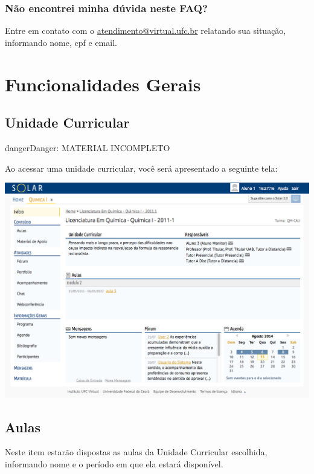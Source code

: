 \documentclass[letterpaper,10pt,english]{sphinxmanual}
\begin{document}
\subsection{Não encontrei minha dúvida neste FAQ?}
\label{faq:nao-encontrei-minha-duvida-neste-faq}
Entre em contato com o \href{mailto:atendimento@virtual.ufc.br}{atendimento@virtual.ufc.br} relatando sua situação, informando nome, cpf e email.


\chapter{Funcionalidades Gerais}
\label{index:modulo-academico}\label{index:funcionalidades-gerais}

\section{Unidade Curricular}
\label{user/curricular_unit::doc}\label{user/curricular_unit:unidade-curricular}
\begin{notice}{danger}{Danger:}
MATERIAL INCOMPLETO
\end{notice}

Ao acessar uma unidade curricular, você será apresentado a seguinte tela:

{\hfill\includegraphics{curricular_unit.png}\hfill}


\section{Aulas}
\label{user/lessons::doc}\label{user/lessons:aulas}
Neste item estarão dispostas as aulas da Unidade Curricular escolhida, informando nome e o período em que ela estará disponível.
\end{document}
